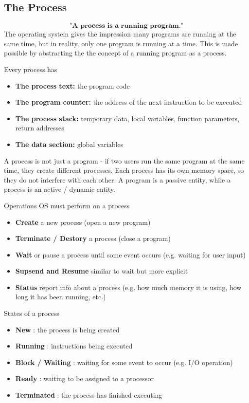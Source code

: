 \documentclass[a4paper, 10pt]{article}
\begin{document}
\subsection{The Process}
$$\textbf{"A process is a running program."}$$
The operating system gives the impression many programs are running at the same time, but in reality, only one program is running at a time. This is made possible by abstracting the the concept of a running program as a process.
\begin{conceptbox}{Every process has}{}
    \begin{itemize}
        \item \textbf{The process text:} the program code
        \item \textbf{The program counter:} the address of the next instruction to be executed
        \item \textbf{The process stack:}  temporary data, local variables, function parameters, return addresses
        \item \textbf{The data section:}  global variables
    \end{itemize}
\end{conceptbox}
A process is not just a program - if two users run the same program at the same time, they create different processes. Each process has its own memory space, so they do not interfere with each other. A program is a passive entity, while a process is an active / dynamic entity.
\begin{conceptbox}{Operations OS must perform on a process}{}
    \begin{itemize}
        \item \textbf{Create} a new process (open a new program)
        \item \textbf{Terminate / Destory} a process (close a program)
        \item \textbf{Wait} or pause a process until some event occurs (e.g. waiting for user input)
        \item \textbf{Supsend and Resume} similar to wait but more explicit
        \item \textbf{Status}  report info about a process (e.g. how much memory it is using, how long it has been running, etc.)
    \end{itemize}
\end{conceptbox}
\begin{conceptbox}{States of a process}{}
    \begin{itemize}
        \item \textbf{New} : the process is being created
        \item \textbf{Running} : instructions being executed
        \item \textbf{Block / Waiting} : waiting for some event to occur (e.g. I/O operation)
        \item \textbf{Ready} : waiting to be assigned to a processor
        \item \textbf{Terminated} : the process has finished executing
    \end{itemize}
\end{conceptbox}
\end{document}
